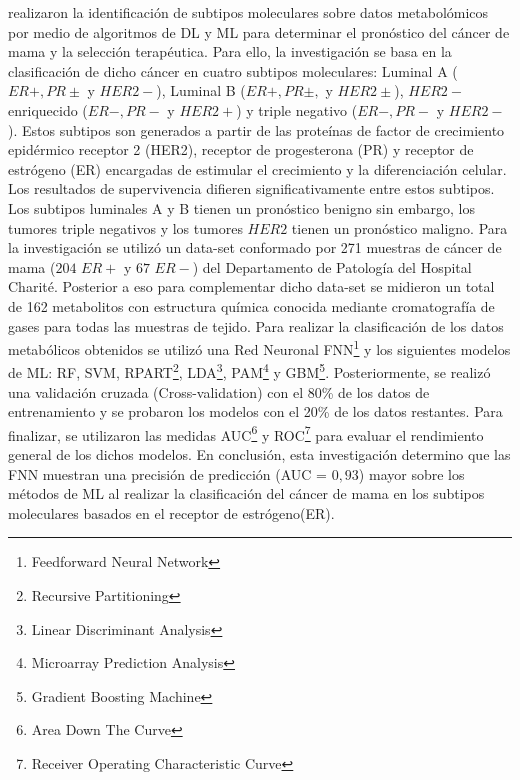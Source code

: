 \citep{Alakwaa2018} realizaron la identificación de subtipos moleculares sobre datos metabolómicos por medio de algoritmos de DL y ML para determinar el pronóstico del cáncer de mama y la selección terapéutica. Para ello, la investigación se basa en la clasificación de dicho cáncer en cuatro subtipos moleculares: Luminal A ($ER +, PR \pm$ y $HER2-$), Luminal B ($ER +, PR \pm,$ y $HER2\pm$), $HER2-$ enriquecido ($ER-, PR-$ y $HER2 +$) y triple negativo ($ER-, PR-$ y $HER2 -$). Estos subtipos son generados a partir de las proteínas de factor de crecimiento epidérmico receptor 2 (HER2), receptor de progesterona (PR) y receptor de estrógeno (ER) encargadas de estimular el crecimiento y la diferenciación celular. Los resultados de supervivencia difieren significativamente entre estos subtipos. Los subtipos luminales A y B tienen un pronóstico benigno sin embargo, los tumores triple negativos y los tumores $HER2$ tienen un pronóstico maligno. Para la investigación se utilizó un data-set conformado por 271 muestras de cáncer de mama ($204$ $ER+ $ y $67$ $ER- $) del Departamento de Patología del Hospital Charité. Posterior a eso para complementar dicho data-set se midieron un total de 162 metabolitos con estructura química conocida mediante cromatografía de gases para todas las muestras de tejido. Para realizar la clasificación de los datos metabólicos obtenidos se utilizó una Red Neuronal FNN\footnote{Feedforward Neural Network} y los siguientes modelos de ML: RF, SVM, RPART\footnote{Recursive Partitioning}, LDA\footnote{Linear Discriminant Analysis}, PAM\footnote{Microarray Prediction Analysis} y GBM\footnote{Gradient Boosting Machine}. Posteriormente, se realizó una validación cruzada (Cross-validation) con el 80\% de los datos de entrenamiento y se probaron los modelos con el 20\% de los datos restantes. Para finalizar, se utilizaron las medidas AUC\footnote{Area Down The Curve} y ROC\footnote{Receiver Operating Characteristic Curve} para evaluar el rendimiento general de los dichos modelos. En conclusión, esta investigación determino que las FNN muestran una precisión de predicción (AUC = $0,93$) mayor sobre los métodos de ML al realizar la clasificación del cáncer de mama en los subtipos moleculares basados en el receptor de estrógeno(ER).

